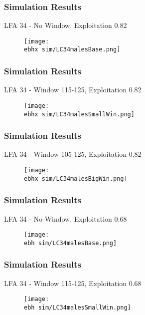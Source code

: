 \documentclass{beamer}
\newcommand{\ebh}{\string~/bio.data/bio.lobster/figures/LFA3438Framework2019/} %
\newcommand{\ebhx}{\string~/bio.data/bio.lobster/figures/LFA3438Framework2019/figures/Brad/} %
\begin{document}
\begin{frame}
\frametitle{Simulation Results}
LFA 34 - No Window, Exploitation 0.82
\begin{figure}
        \begin{center}
            \texttt{[image: \\ebhx sim/LC34malesBase.png]}
        \end{center}
    \end{figure}
\end{frame}



\begin{frame}
\frametitle{Simulation Results}
LFA 34 - Window 115-125, Exploitation 0.82
\begin{figure}
        \begin{center}
            \texttt{[image: \\ebhx sim/LC34malesSmallWin.png]}
        \end{center}
    \end{figure}
\end{frame}


\begin{frame}
\frametitle{Simulation Results}
LFA 34 - Window 105-125, Exploitation 0.82
\begin{figure}
        \begin{center}
            \texttt{[image: \\ebhx sim/LC34malesBigWin.png]}
        \end{center}
    \end{figure}
\end{frame}



\begin{frame}
\frametitle{Simulation Results}
LFA 34 - No Window, Exploitation 0.68
\begin{figure}
        \begin{center}
            \texttt{[image: \\ebh sim/LC34malesBase.png]}
        \end{center}
    \end{figure}
\end{frame}



\begin{frame}
\frametitle{Simulation Results}
LFA 34 - Window 115-125, Exploitation 0.68
\begin{figure}
        \begin{center}
            \texttt{[image: \\ebh sim/LC34malesSmallWin.png]}
        \end{center}
    \end{figure}
\end{frame}
\end{document}
